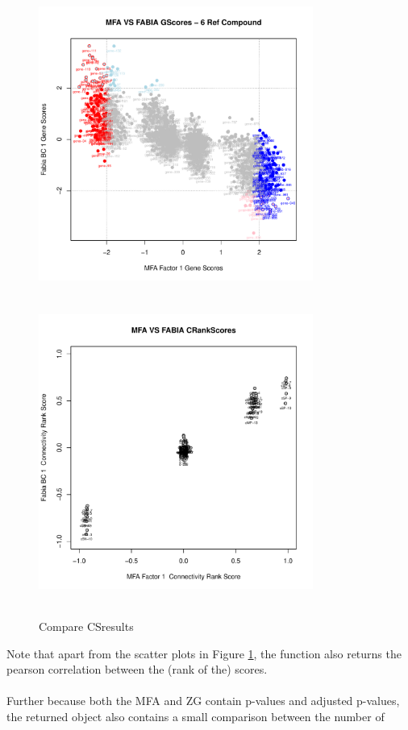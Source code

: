 \documentclass[a4paper]{article}\usepackage[]{graphicx}\usepackage[]{color}
\newenvironment{knitrout}{}{} %
\begin{document}
\begin{knitrout}
\begin{figure}[H]
\includegraphics[width=9cm,height=10cm]{figure/CScompare-4} 
\includegraphics[width=9cm,height=10cm]{figure/CScompare-5} \hfill{}

\caption[Compare CSresults]{Compare CSresults}\label{fig:CScompare}
\end{figure}


\end{knitrout}
\noindent Note that apart from the scatter plots in Figure \ref{fig:CScompare},
the function also returns the pearson correlation between the (rank of
the) scores.
\\ \\
Further because both the MFA and ZG contain p-values and adjusted p-values, the
returned object also contains a small comparison between the number of
\end{document}
